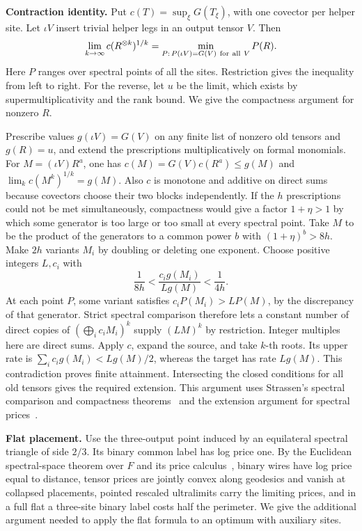 \documentclass[11pt,letterpaper]{article}
\begin{document}
\textbf{Contraction identity.} Put \(c(T)=\sup_\xi G(T_\xi)\), with one covector per helper site. Let \(\iota V\) insert trivial helper legs in an output tensor \(V\). Then
\[
 \lim_{k\to\infty}c(R^{\otimes k})^{1/k}
     =\min_{P:\,P(\iota V)=G(V)\ {\rm for\ all}\ V}P(R).
\]
Here \(P\) ranges over spectral points of all the sites. Restriction gives the inequality from left to right. For the reverse, let \(u\) be the limit, which exists by supermultiplicativity and the rank bound. We give the compactness argument for nonzero \(R\).

Prescribe values \(g(\iota V)=G(V)\) on any finite list of nonzero old tensors and \(g(R)=u\), and extend the prescriptions multiplicatively on formal monomials. For \(M=(\iota V)R^a\), one has \(c(M)=G(V)c(R^a)\le g(M)\) and \(\lim_k c(M^k)^{1/k}=g(M)\). Also \(c\) is monotone and additive on direct sums because covectors choose their two blocks independently. If the \(h\) prescriptions could not be met simultaneously, compactness would give a factor \(1+\eta>1\) by which some generator is too large or too small at every spectral point. Take \(M\) to be the product of the generators to a common power \(b\) with \((1+\eta)^b>8h\). Make \(2h\) variants \(M_i\) by doubling or deleting one exponent. Choose positive integers \(L,c_i\) with
\[
              \frac1{8h}<\frac{c_i g(M_i)}{L g(M)}<\frac1{4h}.
\]
At each point \(P\), some variant satisfies \(c_i P(M_i)>L P(M)\), by the discrepancy of that generator. Strict spectral comparison therefore lets a constant number of direct copies of \((\bigoplus_i c_i M_i)^k\) supply \((L M)^k\) by restriction. Integer multiples here are direct sums. Apply \(c\), expand the source, and take \(k\)-th roots. Its upper rate is \(\sum_i c_i g(M_i)< Lg(M)/2\), whereas the target has rate \(Lg(M)\). This contradiction proves finite attainment. Intersecting the closed conditions for all old tensors gives the required extension. This argument uses Strassen's spectral comparison and compactness theorems~\cite{strassen-spectrum} and the extension argument for spectral prices~\cite[Sections~2--3]{euclid}.

\textbf{Flat placement.} Use the three-output point induced by an equilateral spectral triangle of side \(2/3\). Its binary common label has log price one. By the Euclidean spectral-space theorem over \(F\) and its price calculus~\cite[Theorem~1.1 and Sections~2--5]{euclid}, binary wires have log price equal to distance, tensor prices are jointly convex along geodesics and vanish at collapsed placements, pointed rescaled ultralimits carry the limiting prices, and in a full flat a three-site binary label costs half the perimeter. We give the additional argument needed to apply the flat formula to an optimum with auxiliary sites.
\end{document}

